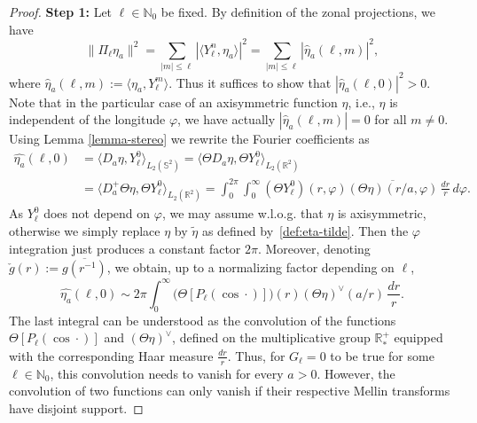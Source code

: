 \documentclass[a4paper,11pt,DIV=11,%
abstract=on%
]{scrartcl}
\def\N{{\mathbb N}}
\def\R{{\mathbb R}}
\begin{document}
\begin{proof}
	\textbf{Step 1:} 
	Let $\ell\in\N_0$ be fixed. By definition of the zonal projections, we have
	\begin{equation} \label{fourier}
	\|\Pi_\ell\eta_a\|^2=\sum_{|m|\leq\ell}|\langle Y_\ell^n, \eta_a \rangle |^2 = \sum_{|m|\leq\ell}|\widehat{\eta}_a(\ell,m)|^2,
	\end{equation} 
	where $\widehat{\eta}_a(\ell,m):= 
	\langle \eta_a , Y_\ell^m \rangle$. 
	Thus it suffices to show that
	$|\widehat{\eta}_a(\ell,0)|^2>0$. 
	Note that in the
	particular case of an axisymmetric function  $\eta$, i.e., 
	$\eta$ is independent of the longitude $\varphi$, 
	we have actually 	$|\widehat{\eta}_a(\ell,m)|=0$ for all $m\neq 0$. 
	Using Lemma	\ref{lemma-stereo} we rewrite the Fourier coefficients as
	\begin{align*}
		\widehat{\eta_a}(\ell,0)
		&=\langle D_a\eta,Y_\ell^0\rangle_{L_2(\mathbb S^2)}
		=\langle\Theta D_a\eta,\Theta Y_\ell^0\rangle_{L_2(\R^2)}\\
		&=\langle D_a^+\Theta\eta,\Theta Y_\ell^0\rangle_{L_2(\R^2)}
		=\int_0^{2\pi}\int_0^\infty(\Theta Y_\ell^0)(r,\varphi)
		\overline{(\Theta\eta)(r/a,\varphi)}\,\frac{dr}{r}\,d\varphi.
	\end{align*}
	As $Y_\ell^0$ does not depend on $\varphi$, we may assume w.l.o.g. that $\eta$ is axisymmetric,
	otherwise we simply replace $\eta$ by $\widetilde\eta$ as
        defined by~\eqref{def:eta-tilde}.  Then the $\varphi$ integration just
	produces a constant factor $2\pi$. 
	Moreover, denoting
	$\check g(r):=\overline{g(r^{-1})}$, 
	we obtain, up to a normalizing factor depending on $\ell$,
	$$\widehat{\eta_a}(\ell,0)
	\sim 2\pi\int_0^\infty\bigl(\Theta[P_\ell(\cos\cdot)]\bigr)(r)
	(\Theta\eta)^\vee(a/r)\,\frac{dr}{r}.$$
	The last integral can be understood as the convolution of the functions
	$\Theta[P_\ell(\cos\cdot)]$ and $(\Theta\eta)^\vee$, defined on the multiplicative group
	$\R_*^+$ equipped with the corresponding Haar measure $\frac{dr}{r}$.
		Thus, for $G_\ell=0$ to be true for some $\ell\in\N_0$, this convolution needs to vanish for every
	$a>0$. However, the convolution of two functions can only vanish if their respective
	Mellin transforms have disjoint support. 
	

\end{proof}
\end{document}
